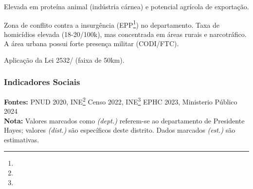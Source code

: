 \begin{description}[style=nextline,leftmargin=0.5cm,font=\bfseries]
\item[Autossuficiência]  Elevada em proteína animal (indústria cárnea) e potencial agrícola de exportação.
\item[Segurança]  Zona de conflito contra a insurgência (EPP\footnote{\fineEPP}) no departamento. Taxa de homicídios elevada (18-20/\allowbreak \allowbreak 100k), mas concentrada em áreas rurais e narcotráfico. A área urbana possui forte presença militar (CODI/\allowbreak \allowbreak FTC).
\item[Leis Local: Capital departamental. Restrição de Fronteira]  Aplicação da Lei 2532/\allowbreak {} (faixa de 50km).
\end{description}
\subsubsection{Indicadores Sociais}

\textbf{Fontes:} PNUD 2020, INE\footnote{\fineINE} Censo 2022, INE\footnote{\fineINE} EPHC 2023, Ministerio
Público 2024\\
\textbf{Nota:} Valores marcados como \emph{(dept.)} referem-se ao
departamento de Presidente Hayes; valores \emph{(dist.)} são específicos
deste distrito. Dados marcados \emph{(est.)} são estimativas.

